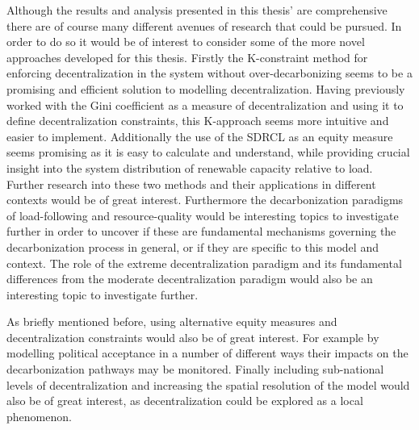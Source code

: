 \documentclass[preprint,12pt,nopreprintline]{elsarticle}
\begin{document}
\medskip
\noindent
Although the results and analysis presented in this thesis' are comprehensive there are of course many different avenues of research that could be pursued. In order to do so it would be of interest to consider some of the more novel approaches developed for this thesis. Firstly the K-constraint method for enforcing decentralization in the system without over-decarbonizing seems to be a promising and efficient solution to modelling decentralization. Having previously worked with the Gini coefficient as a measure of decentralization and using it to define decentralization constraints, this K-approach seems more intuitive and easier to implement. Additionally the use of the SDRCL as an equity measure seems promising as it is easy to calculate and understand, while providing crucial insight into the system distribution of renewable capacity relative to load. Further research into these two methods and their applications in different contexts would be of great interest. Furthermore the decarbonization paradigms of load-following and resource-quality would be interesting topics to investigate further in order to uncover if these are fundamental mechanisms governing the decarbonization process in general, or if they are specific to this model and context. The role of the extreme decentralization paradigm and its fundamental differences from the moderate decentralization paradigm would also be an interesting topic to investigate further.

\medskip
\noindent
As briefly mentioned before, using alternative equity measures and decentralization constraints would also be of great interest. For example by modelling political acceptance in a number of different ways their impacts on the decarbonization pathways may be monitored. Finally including sub-national levels of decentralization and increasing the spatial resolution of the model would also be of great interest, as decentralization could be explored as a local phenomenon.
\end{document}
